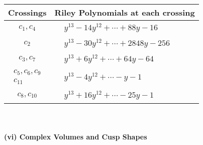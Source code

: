\documentclass[1p]{elsarticle_modified}
\theoremstyle{definition}
\begin{document}
\begin{tabular}{m{50pt}|m{274pt}}
Crossings & \hspace{64pt}Riley Polynomials at each crossing \\
\hline $$\begin{aligned}c_{1},c_{4}\end{aligned}$$&$\begin{aligned}
&y^{13}-14 y^{12}+\cdots+88 y-16
\end{aligned}$\\
\hline $$\begin{aligned}c_{2}\end{aligned}$$&$\begin{aligned}
&y^{13}-30 y^{12}+\cdots+2848 y-256
\end{aligned}$\\
\hline $$\begin{aligned}c_{3},c_{7}\end{aligned}$$&$\begin{aligned}
&y^{13}+6 y^{12}+\cdots+64 y-64
\end{aligned}$\\
\hline $$\begin{aligned}c_{5},c_{6},c_{9}\\c_{11}\end{aligned}$$&$\begin{aligned}
&y^{13}-4 y^{12}+\cdots- y-1
\end{aligned}$\\
\hline $$\begin{aligned}c_{8},c_{10}\end{aligned}$$&$\begin{aligned}
&y^{13}+16 y^{12}+\cdots-25 y-1
\end{aligned}$\\
\hline
\end{tabular}\\~\\
\newpage\flushleft \textbf{(vi) Complex Volumes and Cusp Shapes}
\end{document}
